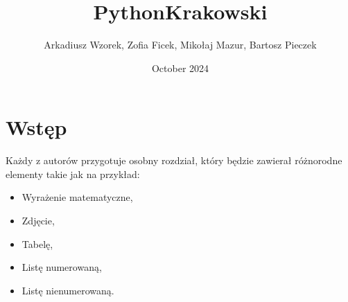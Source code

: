 \documentclass{article}
\title{PythonKrakowski}
\author{Arkadiusz Wzorek, Zofia Ficek, Mikołaj Mazur, Bartosz Pieczek}
\date{October 2024}
\begin{document}
\maketitle

\tableofcontents %

\newpage

\section{Wstęp}

Każdy z autorów przygotuje osobny rozdział, który będzie zawierał różnorodne elementy takie jak na przykład:
\begin{itemize}
    \item Wyrażenie matematyczne,
    \item Zdjęcie,
    \item Tabelę,
    \item Listę numerowaną,
    \item Listę nienumerowaną.
\end{itemize}

\newpage


\pagebreak

\pagebreak

\pagebreak

\end{document}
